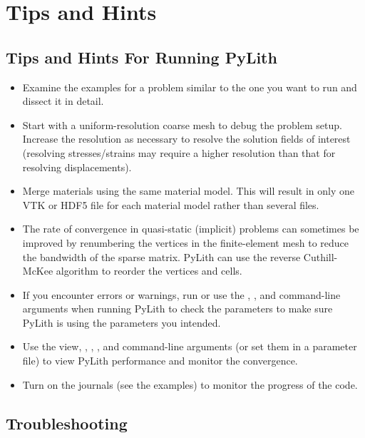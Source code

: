 \section{Tips and Hints}
\label{sec:tips:hints}

\subsection{Tips and Hints For Running PyLith}
\begin{itemize}
\item Examine the examples for a problem similar to the one you want to
run and dissect it in detail.
\item Start with a uniform-resolution coarse mesh to debug the problem setup.
Increase the resolution as necessary to resolve the solution fields
of interest (resolving stresses/strains may require a higher resolution
than that for resolving displacements).
\item Merge materials using the same material model. This will result in
only one VTK or HDF5 file for each material model rather than several
files.
\item The rate of convergence in quasi-static (implicit) problems can sometimes
be improved by renumbering the vertices in the finite-element mesh
to reduce the bandwidth of the sparse matrix. PyLith can use the reverse
Cuthill-McKee algorithm to reorder the vertices and cells.
\item If you encounter errors or warnings, run  or use
the , , and 
command-line arguments when running PyLith to check the parameters
to make sure PyLith is using the parameters you intended.
\item Use the view, ,
, , and 
command-line arguments (or set them in a parameter file) to view PyLith
performance and monitor the convergence.
\item Turn on the journals (see the examples) to monitor the progress of
the code.
\end{itemize}

\subsection{Troubleshooting}
\label{sec:Troubleshooting}


